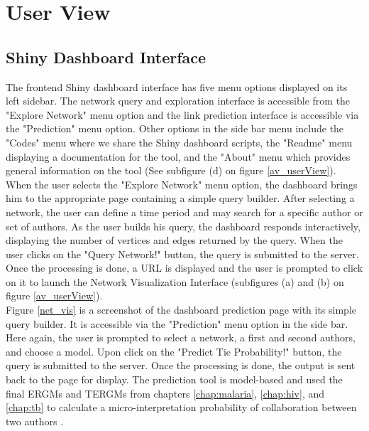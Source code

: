 \section{User View}
\subsection{Shiny Dashboard Interface}
The frontend Shiny dashboard interface has five menu options displayed on its left sidebar. The network query and exploration interface is accessible from the "Explore Network" menu option and the link prediction interface is accessible via the "Prediction" menu option. Other options in the side bar menu include the "Codes" menu where we share the Shiny dashboard scripts, the "Readme" menu displaying a documentation for the tool, and the "About" menu which provides general information on the tool (See subfigure (d) on figure \ref{av_userView}).\\
When the user selects the "Explore Network" menu option, the dashboard brings him to the appropriate page containing a simple query builder. After selecting a network, the user can define a time period and may search for a specific author or set of authors. As the user builds his query, the dashboard responds interactively, displaying the number of vertices and edges returned by the query. When the user clicks on the "Query Network!" button, the query is submitted to the server. Once the processing is done, a URL is displayed and the user is prompted to click on it to launch the Network Visualization Interface (subfigures (a) and (b) on figure \ref{av_userView}).\\
Figure \ref{net_vis} is a screenshot of the dashboard prediction page with its simple query builder. It is accessible via the "Prediction" menu option in the side bar. Here again, the user is prompted to select a network, a first and second authors, and choose a model. Upon click on the "Predict Tie Probability!" button, the query is submitted to the server. Once the processing is done, the output is sent back to the page for display. The prediction tool is model-based and used the final ERGMs and TERGMs from chapters \ref{chap:malaria}, \ref{chap:hiv}, and \ref{chap:tb} to calculate a micro-interpretation probability of collaboration between two authors \cite{desmarais_micro-level_2012}.

